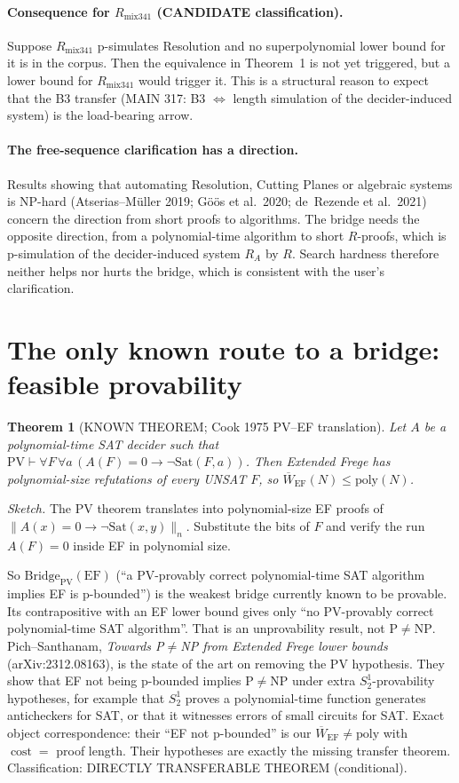 \documentclass[11pt]{article}
\newtheorem{theorem}{Theorem}
\begin{document}
\paragraph{Consequence for $R_{\mathrm{mix341}}$ (CANDIDATE classification).}
Suppose $R_{\mathrm{mix341}}$ p-simulates Resolution and no superpolynomial lower bound for it is in the corpus.
Then the equivalence in Theorem~1 is not yet triggered, but a lower bound for $R_{\mathrm{mix341}}$ would trigger it.
This is a structural reason to expect that the B3 transfer (MAIN 317: B3 $\iff$ length simulation of the decider-induced system) is the load-bearing arrow.

\paragraph{The free-sequence clarification has a direction.}
Results showing that automating Resolution, Cutting Planes or algebraic systems is NP-hard (Atserias--M\"uller 2019; G\"o\"os et al.\ 2020; de~Rezende et al.\ 2021) concern the direction from short proofs to algorithms.
The bridge needs the opposite direction, from a polynomial-time algorithm to short $R$-proofs, which is p-simulation of the decider-induced system $R_A$ by $R$.
Search hardness therefore neither helps nor hurts the bridge, which is consistent with the user's clarification.

\section{The only known route to a bridge: feasible provability}
\begin{theorem}[KNOWN THEOREM; Cook 1975 PV--EF translation]
Let $A$ be a polynomial-time SAT decider such that $\mathrm{PV}\vdash\forall F\,\forall a\,(A(F)=0\rightarrow \neg\mathrm{Sat}(F,a))$.
Then Extended Frege has polynomial-size refutations of every UNSAT $F$, so $\overline W_{\mathrm{EF}}(N)\le\mathrm{poly}(N)$.
\end{theorem}
\emph{Sketch.} The PV theorem translates into polynomial-size EF proofs of $\|A(x)=0\to\neg\mathrm{Sat}(x,y)\|_n$. Substitute the bits of $F$ and verify the run $A(F)=0$ inside EF in polynomial size.

So $\mathrm{Bridge}_{\mathrm{PV}}(\mathrm{EF})$ (``a PV-provably correct polynomial-time SAT algorithm implies EF is p-bounded'') is the weakest bridge currently known to be provable.
Its contrapositive with an EF lower bound gives only ``no PV-provably correct polynomial-time SAT algorithm''. That is an unprovability result, not $\mathrm P\ne\mathrm{NP}$.
Pich--Santhanam, \emph{Towards P$\ne$NP from Extended Frege lower bounds} (arXiv:2312.08163), is the state of the art on removing the PV hypothesis.
They show that EF not being p-bounded implies $\mathrm P\ne\mathrm{NP}$ under extra $S^1_2$-provability hypotheses, for example that $S^1_2$ proves a polynomial-time function generates anticheckers for SAT, or that it witnesses errors of small circuits for SAT.
Exact object correspondence: their ``EF not p-bounded'' is our $\overline W_{\mathrm{EF}}\ne\mathrm{poly}$ with $\operatorname{cost}=$ proof length. Their hypotheses are exactly the missing transfer theorem.
Classification: DIRECTLY TRANSFERABLE THEOREM (conditional).
\end{document}
